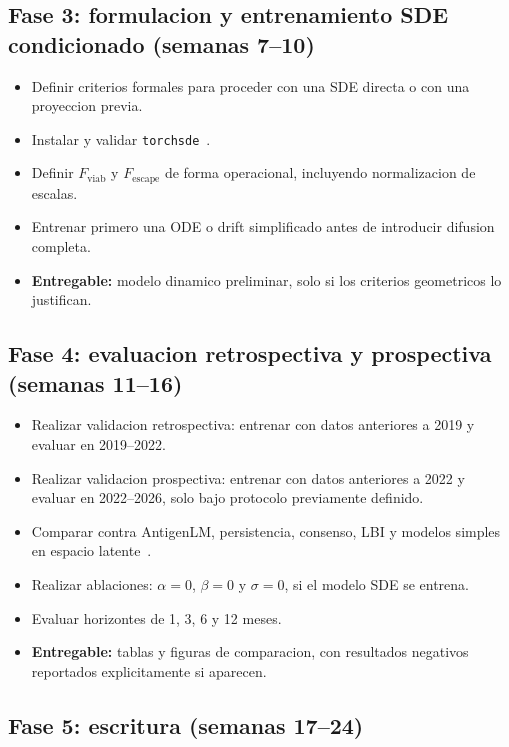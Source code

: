 \documentclass[12pt,letterpaper]{article}
\newcommand{\Fviab}{F_{\mathrm{viab}}}
\newcommand{\Fescape}{F_{\mathrm{escape}}}
\begin{document}
\subsection*{Fase 3: formulacion y entrenamiento SDE condicionado \texorpdfstring{(semanas 7--10)}{(semanas 7--10)}}

\begin{itemize}[leftmargin=2em]
    \item Definir criterios formales para proceder con una SDE directa o con una proyeccion previa.
    \item Instalar y validar \texttt{torchsde}~\cite{li2020scalable}.
    \item Definir $\Fviab$ y $\Fescape$ de forma operacional, incluyendo normalizacion de escalas.
    \item Entrenar primero una ODE o drift simplificado antes de introducir difusion completa.
    \item \textbf{Entregable:} modelo dinamico preliminar, solo si los criterios geometricos lo justifican.
\end{itemize}

\subsection*{Fase 4: evaluacion retrospectiva y prospectiva \texorpdfstring{(semanas 11--16)}{(semanas 11--16)}}

\begin{itemize}[leftmargin=2em]
    \item Realizar validacion retrospectiva: entrenar con datos anteriores a 2019 y evaluar en 2019--2022.
    \item Realizar validacion prospectiva: entrenar con datos anteriores a 2022 y evaluar en 2022--2026, solo bajo protocolo previamente definido.
    \item Comparar contra AntigenLM, persistencia, consenso, LBI y modelos simples en espacio latente~\cite{neher2014predicting}.
    \item Realizar ablaciones: $\alpha=0$, $\beta=0$ y $\sigma=0$, si el modelo SDE se entrena.
    \item Evaluar horizontes de 1, 3, 6 y 12 meses.
    \item \textbf{Entregable:} tablas y figuras de comparacion, con resultados negativos reportados explicitamente si aparecen.
\end{itemize}

\subsection*{Fase 5: escritura \texorpdfstring{(semanas 17--24)}{(semanas 17--24)}}
\end{document}
